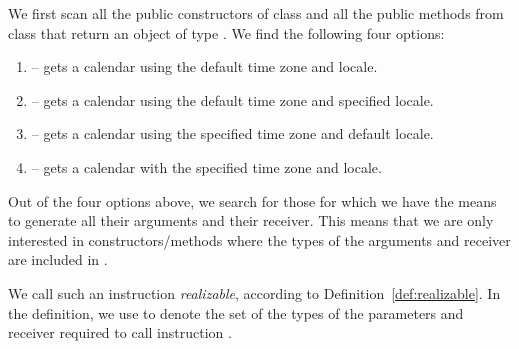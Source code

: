 \documentclass[runningheads,a4paper]{llncs}
\begin{document}
We first scan all the public constructors of class 
and all the public methods from class  that return an object of type . We find the following four options:

\begin{enumerate}
  \item {} -- gets a calendar using the default time zone and locale.
  \item {} -- gets a calendar using the default time zone and specified locale.
  \item {} -- gets a calendar using the specified time zone and default locale.
  \item {} -- gets a calendar with the specified time zone and locale.
\end{enumerate}

%
Out of the four options above, we search for those for which we have the means to generate all their arguments and their receiver. This means that we are only interested in constructors/methods
where the types of the arguments and receiver are included in .

We call such an instruction {\em realizable}, according to Definition~\ref{def:realizable}.
In the definition, we use
 to denote
the set of the types of the parameters and receiver required to call instruction .
\end{document}

